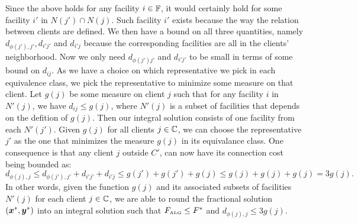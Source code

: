\documentclass[oneside,final]{ucr}
\begin{document}
Since the above holds for any facility $i \in \mathbb{F}$, it
would certainly hold for some facility $i'$ in $N(j') \cap
N(j)$. Such facility $i'$ exists because the way the
relation between clients are defined. We then have a bound
on all three quantities, namely $d_{\phi(j'), j'}, d_{i'j'}$
and $d_{i'j}$ because the corresponding facilities are all
in the clients' neighborhood. Now we only need $d_{\phi(j')
  j'}$ and $d_{i'j'}$ to be small in terms of some bound on
$d_{ij}$. As we have a choice on which representative we
pick in each equivalence class, we pick the representative
to minimize some measure on that client. Let $g(j)$ be some
measure on client $j$ such that for any facility $i$ in
$N'(j)$, we have $d_{ij} \leq g(j)$, where $N'(j)$ is a
subset of facilities that depends on the defition of
$g(j)$. Then our integral solution consists of one facility
from each $N'(j')$. Given $g(j)$ for all clients
$j\in\mathbb{C}$, we can choose the representative $j'$ as
the one that minimizes the measure $g(j)$ in its equivalance
class. One consequence is that any client $j$ outside $C'$,
can now have its connection cost being bounded as:
\begin{equation*}
  d_{\phi(j), j} \leq d_{\phi(j'), j'} + d_{i'j'} + d_{i'j}
  \leq g(j') + g(j') + g(j) \leq g(j) + g(j) + g(j) = 3g(j).
\end{equation*}
In other words, given the function $g(j)$ and its associated
subsets of facilities $N'(j)$ for each client $j\in
\mathbb{C}$, we are able to round the fractional solution
$(\boldsymbol{x}^\ast, \boldsymbol{y}^\ast)$ into an integral solution such that
$F_{\mbox{\tiny\rm ALG}} \leq F^\ast$ and $d_{\phi(j), j} \leq 3
g(j)$.
\end{document}
